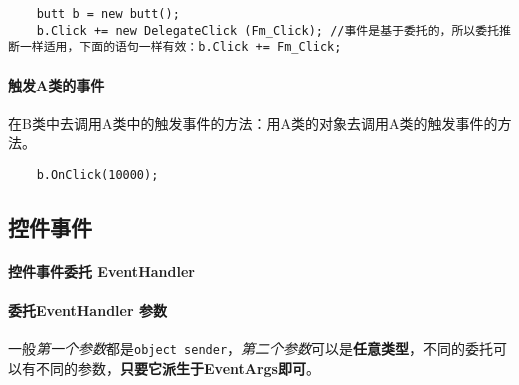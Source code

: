\documentclass[UTF8,a4paper,12pt]{ctexbook}
\begin{document}
				\begin{lstlisting}
	butt b = new butt();
	b.Click += new DelegateClick (Fm_Click); //事件是基于委托的，所以委托推断一样适用，下面的语句一样有效：b.Click += Fm_Click;
				\end{lstlisting}
				
			\paragraph{触发A类的事件}
				在B类中去调用A类中的触发事件的方法：用A类的对象去调用A类的触发事件的方法。
				\begin{lstlisting}
	b.OnClick(10000);    
				\end{lstlisting}
			
		\subsection{控件事件}
			\paragraph{控件事件委托 EventHandler}
			
			\paragraph{委托EventHandler 参数}
				
				一般\textit{第一个参数}都是\verb|object sender|，\textit{第二个参数}可以是\textbf{任意类型}，不同的委托可以有不同的参数，\textbf{只要它派生于EventArgs即可}。
			
\end{document}
